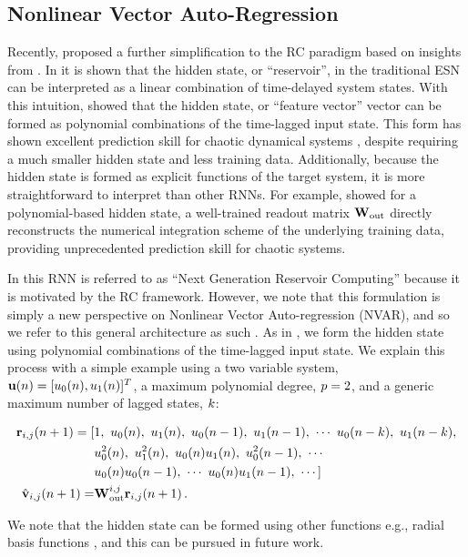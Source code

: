 \subsection{Nonlinear Vector Auto-Regression}
\label{subsec:nvar}

Recently, \citet{gauthier_next_2021} proposed a further simplification to the RC
paradigm based on insights from \citet{bollt_explaining_2021}.
In \citet{bollt_explaining_2021} it is shown that the hidden state, or
``reservoir'', in the traditional ESN can be interpreted as a linear combination
of time-delayed system states.
With this intuition, \citet{gauthier_next_2021} showed that the hidden state, or
``feature vector'' vector can be formed as polynomial combinations of the
time-lagged input state.
This form has shown excellent prediction skill for chaotic dynamical systems
\citep{barbosa_learning_2022,gauthier_next_2021}, despite requiring a much
smaller hidden state and less training data.
Additionally, because the hidden state is formed as explicit functions of the
target system, it is more straightforward to interpret than other RNNs.
For example,  showed for a polynomial-based hidden state, a
well-trained readout matrix $\mathbf{W}_\text{out}$ directly reconstructs the numerical integration scheme of
the underlying training data, providing unprecedented prediction skill for
chaotic systems.


In \citet{gauthier_next_2021} this RNN is referred to as ``Next Generation
Reservoir Computing'' because it is motivated by the RC framework.
However, we note that this formulation is simply a new perspective on Nonlinear
Vector Auto-regression (NVAR), and so we refer to this general architecture as
such .
As in \citet{gauthier_next_2021}, we form the hidden state using
polynomial combinations of the time-lagged input state.
We explain this process with a simple example using a two variable system,
$\mathbf{u}(n) = [u_0(n), u_1(n)]^T$,
a maximum polynomial degree,
$p=2$, and a generic maximum number of lagged states, $k$:
\begin{linenomath*}\begin{equation}
    \begin{aligned}
        \mathbf{r}_{i,j}(n+1)
        =
        [&1, \,\,
        u_0(n), \,\, u_1(n), \,\,
        u_0(n-1),\,\, u_1(n-1), \,\,
        \cdots \,\,
        u_0(n-k), \,\, u_1(n-k), \\
         &u_0^2(n), \,\, u_1^2(n), \,\, u_0(n)u_1(n), \,\,
        u_0^2(n-1), \,\, \cdots \\
         &u_0(n)u_0(n-1), \,\, \cdots \,\,
        u_0(n)u_1(n-1), \,\, \cdots
        ] \\
        \hat{\mathbf{v}}_{i,j}(n+1) = &\mathbf{W}_\text{out}^{i,j} \mathbf{r}_{i,j}(n+1) \, .
    \end{aligned}
\end{equation}\end{linenomath*}
We note that the hidden state can be formed using other functions e.g., radial
basis functions , and this can be pursued in future work.

